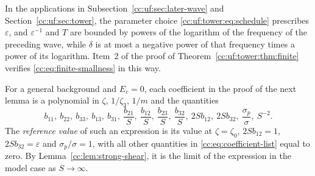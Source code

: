In the applications in Subsection~\ref{cc:uf:sec:later-wave} and
Section~\ref{cc:uf:sec:tower}, the parameter choice
\eqref{cc:uf:tower:eq:schedule} prescribes $\varepsilon$, and
$\varepsilon^{-1}$ and $T$ are bounded by powers of the logarithm of
the frequency of the preceding wave, while $\delta$ is at most a
negative power of that frequency times a power of its logarithm.
Item~2 of the proof of Theorem~\ref{cc:uf:tower:thm:finite} verifies
\eqref{cc:eq:finite-smallness} in this way.

For a general background and $E_c=0$, each coefficient in the proof of
the next lemma is a polynomial in $\zeta$, $1/\zeta_3$, $1/m$ and the quantities
\begin{equation}\label{cc:eq:coefficient-list}
 b_{11},\ b_{22},\ b_{33},\ b_{13},\ b_{31},\
 \frac{b_{21}}S,\ \frac{b_{12}}S,\ \frac{b_{23}}S,\ \frac{b_{32}}S,\
 2Sb_{12},\ 2Sb_{32},\ \frac{\sigma_p}\sigma,\ S^{-2}.
\end{equation}
The \emph{reference value} of such an expression is its value at
$\zeta=\zeta_0$, $2Sb_{12}=1$, $2Sb_{32}=\varepsilon$ and
$\sigma_p/\sigma=1$, with all other quantities in
\eqref{cc:eq:coefficient-list} equal to zero. By
Lemma~\ref{cc:lem:strong-shear}, it is the limit of the expression in
the model case as $S\to\infty$.

